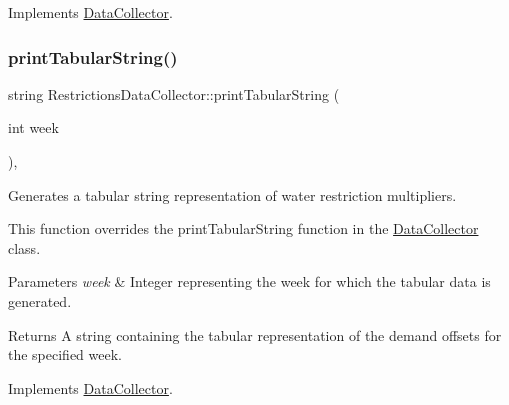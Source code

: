 Implements \mbox{\hyperlink{classDataCollector_a98dcb4ec871d9c7fbf7545c64e5ccc67}{Data\+Collector}}.

\mbox{\label{classRestrictionsDataCollector_a45e5612e70ec98430e31271f68ca407e}} 
\subsubsection{\texorpdfstring{print\+Tabular\+String()}{printTabularString()}}
{\footnotesize\ttfamily string Restrictions\+Data\+Collector\+::print\+Tabular\+String (\begin{DoxyParamCaption}\item[{int}]{week }\end{DoxyParamCaption})\hspace{0.3cm}{\ttfamily [override]}, {\ttfamily [virtual]}}



Generates a tabular string representation of water restriction multipliers. 

This function overrides the {\ttfamily print\+Tabular\+String} function in the {\ttfamily \mbox{\hyperlink{classDataCollector}{Data\+Collector}}} class.


\begin{DoxyParams}{Parameters}
{\em week} & Integer representing the week for which the tabular data is generated.\\
\hline
\end{DoxyParams}
\begin{DoxyReturn}{Returns}
A string containing the tabular representation of the demand offsets for the specified week. 
\end{DoxyReturn}


Implements \mbox{\hyperlink{classDataCollector_a397fccabe0223267eea8fc7cac0e59da}{Data\+Collector}}.

\mbox{\label{classRestrictionsDataCollector_a2676a6693b254997d223fc1c437258ab}} 
